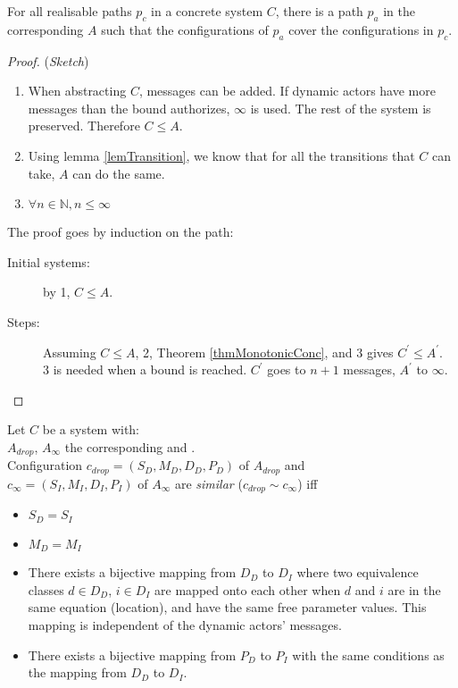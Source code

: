 \documentclass[a4paper]{report}
\numberwithin{algorithm}{chapter}
\begin{document}
\begin{lem}
\label{lemOverApprox}
For all realisable paths $p_c$ in a concrete system $C$, there is a path $p_a$ in the corresponding \iabs{} $A$ such that the configurations of $p_a$ cover the configurations in $p_c$.
\end{lem}
\begin{proof} (\emph{Sketch})
\begin{enumerate}
\item When abstracting $C$, messages can be added.
If dynamic actors have more messages than the bound authorizes, $\infty$ is used.
The rest of the system is preserved.
Therefore $C \leq A$.

\item Using lemma \ref{lemTransition}, we know that for all the transitions that $C$ can take, $A$ can do the same.

\item $\forall n \in \mathbb{N}, n \leq \infty$ 
\end{enumerate}

\noindent
The proof goes by induction on the path:
\begin{description}
\item[Initial systems:] by 1, $C \leq A$.
\item[Steps:] Assuming $C \leq A$, 2, Theorem \ref{thmMonotonicConc}, and 3 gives $C^\prime \leq A^\prime$.\\
3 is needed when a bound is reached.
$C^\prime$ goes to $n+1$ messages, $A^\prime$ to $\infty$.
\end{description}

\end{proof}

\begin{define}[$\sim$]
\label{defSimilar}
Let $C$ be a system with:\\ $A_{drop}$, $A_\infty$ the corresponding \dabs{} and \iabs{}.\\
Configuration $c_{drop} = (S_D, M_D, D_D, P_D)$ of $A_{drop}$ and\\
$c_\infty = (S_I, M_I, D_I, P_I)$ of $A_\infty$ are \emph{similar} ($c_{drop} \sim c_\infty$) iff\\
\begin{itemize}
\item $S_D = S_I$
\item $M_D = M_I$
\item There exists a bijective mapping from $D_D$ to $D_I$ where two equivalence classes $d \in D_D$, $i \in D_I$ are mapped onto each other when
$d$ and $i$ are in the same equation (location), and have the same free parameter values.
This mapping is independent of the dynamic actors' messages.
\item There exists a bijective mapping from $P_D$ to $P_I$ with the same conditions as the mapping from $D_D$ to $D_I$.
\end{itemize}
\end{define}
\end{document}
